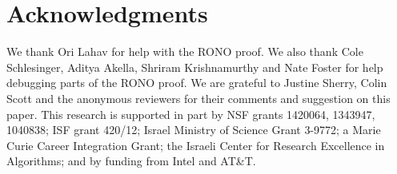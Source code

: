 \section{Acknowledgments}
\label{sec:ack}
We thank Ori Lahav for help with the RONO proof. We also thank Cole Schlesinger, Aditya Akella, Shriram Krishnamurthy and Nate Foster for help debugging parts of the RONO proof. We are grateful to Justine Sherry, Colin Scott and the anonymous reviewers for their comments and suggestion on this paper. This research is supported in part by NSF grants 1420064, 1343947, 1040838; ISF grant 420/12; Israel Ministry of Science Grant 3-9772; a Marie Curie Career Integration Grant; the Israeli Center for Research Excellence in Algorithms; and by funding from Intel and AT\&T.